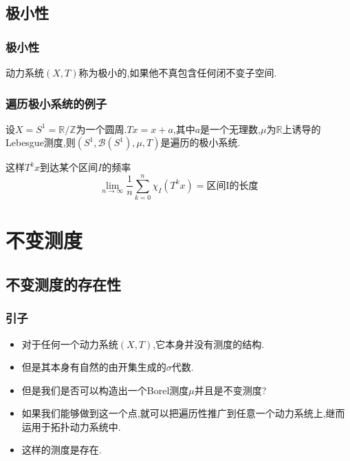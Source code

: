 \documentclass[compress,red]{beamer}
\begin{document}
\subsection{极小性}
\begin{frame}
\frametitle{极小性}
\begin{definition}
动力系统$(X,T)$称为极小的,如果他不真包含任何闭不变子空间.

\end{definition}
\end{frame}

\begin{frame}
\frametitle{遍历极小系统的例子}
\begin{example}[$S^1$的无理旋转]
设$X=S^1=\mathbb{R}/\mathbb{Z}$为一个圆周.$Tx=x+a$,其中$a$是一个无理数,$\mu$为$\mathbb{R}$上诱导的Lebesgue测度,则$(S^1,\mathscr{B}(S^1),\mu,T)$是遍历的极小系统.
\end{example}
\pause
\begin{block}

这样$T^kx$到达某个区间$I$的频率$$\lim_{n\to \infty}\frac{1}{n}\sum_{k=0}^n\chi_I(T^kx)=\text{区间I的长度}$$

\end{block}
\end{frame}





\section{不变测度}
\subsection{不变测度的存在性}
\begin{frame}
\frametitle{引子}
\begin{itemize}
\item<1-> 对于任何一个动力系统$(X,T)$,它本身并没有测度的结构.
\item<2-> 但是其本身有自然的由开集生成的$\sigma$代数.
\item<3-> 但是我们是否可以构造出一个Borel测度$\mu$并且是不变测度?
\item<4-> 如果我们能够做到这一个点,就可以把遍历性推广到任意一个动力系统上,继而运用于拓扑动力系统中.
\item<5-> 这样的测度是存在.

\end{itemize}

\end{frame}
\end{document}

